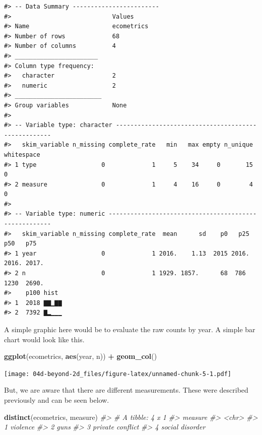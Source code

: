 \documentclass[
]{book}
\newenvironment{Shaded}{\begin{snugshade}}{\end{snugshade}}
\newcommand{\CommentTok}[1]{\textcolor[rgb]{0.56,0.35,0.01}{\textit{#1}}}
\newcommand{\KeywordTok}[1]{\textcolor[rgb]{0.13,0.29,0.53}{\textbf{#1}}}
\newcommand{\NormalTok}[1]{#1}
\newcommand{\OperatorTok}[1]{\textcolor[rgb]{0.81,0.36,0.00}{\textbf{#1}}}
\newcommand{\StringTok}[1]{\textcolor[rgb]{0.31,0.60,0.02}{#1}}
\begin{document}
\begin{verbatim}
#> -- Data Summary ------------------------
#>                            Values    
#> Name                       ecometrics
#> Number of rows             68        
#> Number of columns          4         
#> _______________________              
#> Column type frequency:               
#>   character                2         
#>   numeric                  2         
#> ________________________             
#> Group variables            None      
#> 
#> -- Variable type: character ----------------------------------------------------
#>   skim_variable n_missing complete_rate   min   max empty n_unique whitespace
#> 1 type                  0             1     5    34     0       15          0
#> 2 measure               0             1     4    16     0        4          0
#> 
#> -- Variable type: numeric ------------------------------------------------------
#>   skim_variable n_missing complete_rate  mean      sd    p0   p25   p50   p75
#> 1 year                  0             1 2016.    1.13  2015 2016. 2016. 2017.
#> 2 n                     0             1 1929. 1857.      68  786  1230  2690.
#>    p100 hist 
#> 1  2018 ▇▇▁▇▇
#> 2  7392 ▇▂▁▁▁
\end{verbatim}

A simple graphic here would be to evaluate the raw counts by year. A simple bar chart would look like this.

\begin{Shaded}
\begin{Highlighting}[]
\KeywordTok{ggplot}\NormalTok{(ecometrics, }\KeywordTok{aes}\NormalTok{(year, n)) }\OperatorTok{+}
\StringTok{  }\KeywordTok{geom\_col}\NormalTok{()}
\end{Highlighting}
\end{Shaded}

\texttt{[image: 04d-beyond-2d\_files/figure-latex/unnamed-chunk-5-1.pdf]}

But, we are aware that there are different measurements. These were described previously and can be seen below.

\begin{Shaded}
\begin{Highlighting}[]
\KeywordTok{distinct}\NormalTok{(ecometrics, measure)}
\CommentTok{\#\textgreater{} \# A tibble: 4 x 1}
\CommentTok{\#\textgreater{}   measure         }
\CommentTok{\#\textgreater{}   \textless{}chr\textgreater{}           }
\CommentTok{\#\textgreater{} 1 violence        }
\CommentTok{\#\textgreater{} 2 guns            }
\CommentTok{\#\textgreater{} 3 private conflict}
\CommentTok{\#\textgreater{} 4 social disorder}
\end{Highlighting}
\end{Shaded}
\end{document}
